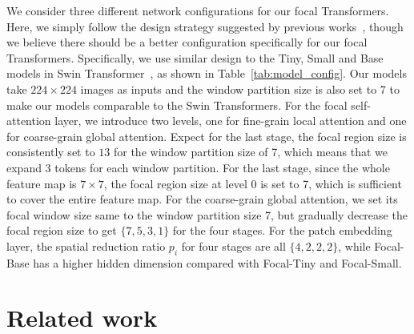 \documentclass{article}
\begin{document}
We consider three different network configurations for our focal Transformers. Here, we simply follow the design strategy suggested by previous works~\cite{wang2021pyramid,wu2021cvt,liu2021swin}, though we believe there should be a better configuration specifically for our focal Transformers. Specifically, we use similar design to the Tiny, Small and Base models in Swin Transformer~\cite{liu2021swin}, as shown in Table~\ref{tab:model_config}. Our models take $224 \times 224$ images as inputs and the window partition size is also set to 7 to make our models comparable to the Swin Transformers. For the focal self-attention layer, we introduce two levels, one for fine-grain local attention and one for coarse-grain global attention. Expect for the last stage, the focal region size is consistently set to $13$ for the window partition size of 7, which means that we expand 3 tokens for each window partition. For the last stage, since the whole feature map is $7 \times 7$, the focal region size at level 0 is set to 7, which is sufficient to cover the entire feature map. For the coarse-grain global attention, we set its focal window size same to the window partition size 7, but gradually decrease the focal region size to get $\{7,5,3,1\}$ for the four stages. For the patch embedding layer, the spatial reduction ratio $p_i$ for four stages are all $\{4,2,2,2\}$, while Focal-Base has a higher hidden dimension compared with Focal-Tiny and Focal-Small. \section{Related work}
\end{document}
